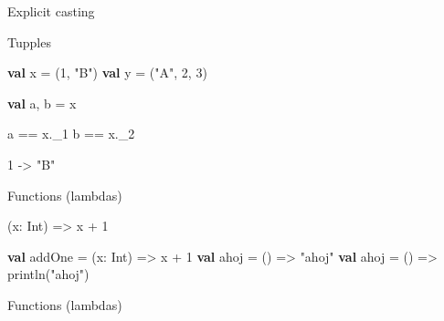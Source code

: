 \documentclass[ignorenonframetext,]{beamer}
\newenvironment{Shaded}{\begin{snugshade}}{\end{snugshade}}
\newcommand{\KeywordTok}[1]{\textcolor[rgb]{0.13,0.29,0.53}{\textbf{#1}}}
\newcommand{\DecValTok}[1]{\textcolor[rgb]{0.00,0.00,0.81}{#1}}
\newcommand{\StringTok}[1]{\textcolor[rgb]{0.31,0.60,0.02}{#1}}
\newcommand{\FunctionTok}[1]{\textcolor[rgb]{0.00,0.00,0.00}{#1}}
\newcommand{\NormalTok}[1]{#1}
\begin{document}
\begin{frame}[fragile]
\begin{block}{Explicit casting}
\end{block}

\begin{block}{Tupples}

\begin{Shaded}
\begin{Highlighting}[]
\KeywordTok{val}\NormalTok{ x = (}\DecValTok{1}\NormalTok{, }\StringTok{"B"}\NormalTok{)}
\KeywordTok{val}\NormalTok{ y = (}\StringTok{"A"}\NormalTok{, }\DecValTok{2}\NormalTok{, }\DecValTok{3}\NormalTok{)}
\end{Highlighting}
\end{Shaded}

\begin{Shaded}
\begin{Highlighting}[]
\KeywordTok{val}\NormalTok{ a, b = x}

\NormalTok{a == x._}\DecValTok{1}
\NormalTok{b == x._}\DecValTok{2}
\end{Highlighting}
\end{Shaded}

\begin{Shaded}
\begin{Highlighting}[]
\DecValTok{1}\NormalTok{ -> }\StringTok{"B"}
\end{Highlighting}
\end{Shaded}

\end{block}

\begin{block}{Functions (lambdas)}

\begin{Shaded}
\begin{Highlighting}[]
\NormalTok{(x: Int) => x + }\DecValTok{1}
\end{Highlighting}
\end{Shaded}

\begin{Shaded}
\begin{Highlighting}[]
\KeywordTok{val}\NormalTok{ addOne = (x: Int) => x + }\DecValTok{1}
\KeywordTok{val}\NormalTok{ ahoj = () => }\StringTok{"ahoj"}
\KeywordTok{val}\NormalTok{ ahoj = () => }\FunctionTok{println}\NormalTok{(}\StringTok{"ahoj"}\NormalTok{)}
\end{Highlighting}
\end{Shaded}

\end{block}

\begin{block}{Functions (lambdas)}


\end{block}
\end{frame}
\end{document}
